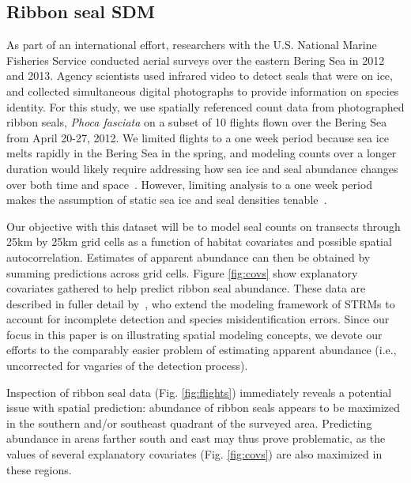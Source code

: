 \documentclass[10pt,letterpaper]{article}
\begin{document}
\subsection*{Ribbon seal SDM}

As part of an international effort, researchers with the U.S. National Marine Fisheries Service conducted aerial surveys over the eastern Bering Sea in 2012 and 2013.  Agency scientists used infrared video to detect seals that were on ice, and collected simultaneous digital photographs to provide information on species identity. For this study, we use spatially referenced count data from photographed ribbon seals, {\it Phoca fasciata} on a subset of 10 flights flown over the Bering Sea from April 20-27, 2012.  We limited flights to a one week period because sea ice melts rapidly in the Bering Sea in the spring, and modeling counts over a longer duration would likely require addressing how sea ice and seal abundance changes over both time and space~\cite{ConnEtAl2015}. However, limiting analysis to a one week period makes the assumption of static sea ice and seal densities tenable~\cite{ConnEtAl2014}.

Our objective with this dataset will be to model seal counts on transects through 25km by 25km grid cells as a function of habitat covariates and possible spatial autocorrelation.
Estimates of apparent abundance can then be obtained by summing predictions across grid cells. Figure \ref{fig:covs} show explanatory covariates gathered to help predict ribbon seal abundance.  These data are described in fuller detail by~\cite{ConnEtAl2014}, who extend the modeling framework of STRMs to account for incomplete detection and species misidentification errors.  Since our focus in this paper is on illustrating spatial modeling concepts, we devote our efforts to the comparably easier problem of estimating apparent abundance (i.e., uncorrected for vagaries of the detection process).

Inspection of ribbon seal data (Fig. \ref{fig:flights}) immediately reveals a potential
issue with spatial prediction: abundance of ribbon seals appears to be maximized in the southern and/or southeast quadrant of the surveyed area.  Predicting abundance in areas farther south and east may thus prove problematic, as the values of several explanatory covariates (Fig. \ref{fig:covs}) are also maximized in these regions.
\end{document}
